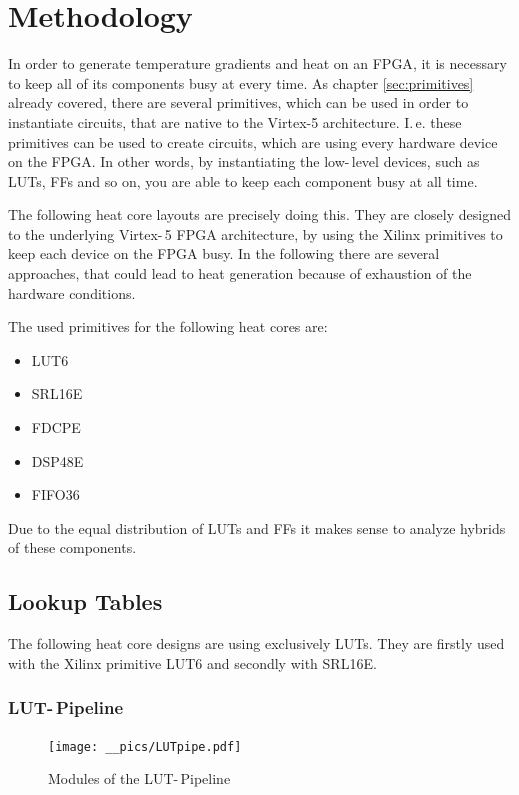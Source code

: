 
\chapter{Methodology}
\label{ch:methodology}


In order to generate temperature gradients and heat on an \ac{FPGA}, it is necessary to keep all of its components busy at every time. As chapter \ref{sec:primitives} already covered, there are several primitives, which can be used in order to instantiate circuits, that are native to the Virtex-5 architecture. I.\,e. these primitives can be used to create circuits, which are using every hardware device on the \ac{FPGA}. In other words, by instantiating the low-\,level devices, such as \acp{LUT}, \acp{FF} and so on, you are able to keep each component busy at all time.

The following heat core layouts are precisely doing this. They are closely designed to the underlying Virtex-\,5 \ac{FPGA} architecture, by using the Xilinx primitives to keep each device on the \ac{FPGA} busy. In the following there are several approaches, that could lead to heat generation because of exhaustion of the hardware conditions.

The used primitives for the following heat cores are:

\begin{itemize}
	\item \ac{LUT6} 
	\item \ac{SRL16E}  
	\item \ac{FDCPE}
	\item \ac{DSP48E}
	\item \ac{FIFO36}
\end{itemize}

Due to the equal distribution of \acp{LUT} and \acp{FF} it makes sense to analyze hybrids of these components.

\section{Lookup Tables}
The following heat core designs are using exclusively \acp{LUT}. They are firstly used with the Xilinx primitive \ac{LUT6} and secondly with \ac{SRL16E}.

\subsection{LUT-\,Pipeline}
\label{sec:lutpipe}

\begin{figure}[h]
		\texttt{[image: \_\_pics/LUTpipe.pdf]}
		\caption{Modules of the LUT-\,Pipeline}
		\label{pic:lutpipe}	
	\end{figure} 

